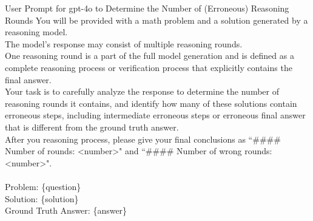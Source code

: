 \begin{prompt}{User Prompt for gpt-4o to Determine the Number of (Erroneous) Reasoning Rounds}
You will be provided with a math problem and a solution generated by a reasoning model.
\\
The model's response may consist of multiple reasoning rounds.
\\
One reasoning round is a part of the full model generation and is defined as a complete reasoning process or verification process that explicitly contains the final answer.
\\
Your task is to carefully analyze the response to determine the number of reasoning rounds it contains, and identify how many of these solutions contain erroneous steps, including intermediate erroneous steps or erroneous final answer that is different from the ground truth answer.
\\
After you reasoning process, please give your final conclusions as ``\#\#\#\# Number of rounds: \textless number\textgreater" and ``\#\#\#\# Number of wrong rounds: \textless number\textgreater".
\\
\\
Problem: \{question\}
\\
Solution: \{solution\}
\\
Ground Truth Answer: \{answer\}
\end{prompt}